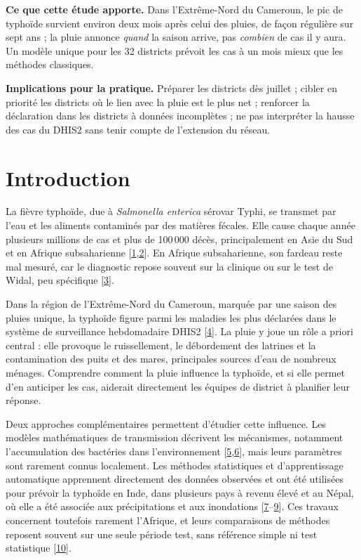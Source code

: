 \documentclass[11pt]{article}
\begin{document}
\textbf{Ce que cette étude apporte.} Dans l'Extrême-Nord du Cameroun, le pic de typhoïde survient environ deux mois après celui des pluies, de façon régulière sur sept ans ; la pluie annonce \textit{quand} la saison arrive, pas \textit{combien} de cas il y aura. Un modèle unique pour les 32 districts prévoit les cas à un mois mieux que les méthodes classiques.


\textbf{Implications pour la pratique.} Préparer les districts dès juillet ; cibler en priorité les districts où le lien avec la pluie est le plus net ; renforcer la déclaration dans les districts à données incomplètes ; ne pas interpréter la hausse des cas du DHIS2 sans tenir compte de l'extension du réseau.

\section{Introduction}
La fièvre typhoïde, due à \textit{Salmonella enterica} sérovar Typhi, se transmet par l'eau et les aliments contaminés par des matières fécales. Elle cause chaque année plusieurs millions de cas et plus de 100\,000 décès, principalement en Asie du Sud et en Afrique subsaharienne [\hyperlink{ref1}{1},\hyperlink{ref2}{2}]. En Afrique subsaharienne, son fardeau reste mal mesuré, car le diagnostic repose souvent sur la clinique ou sur le test de Widal, peu spécifique [\hyperlink{ref3}{3}].

Dans la région de l'Extrême-Nord du Cameroun, marquée par une saison des pluies unique, la typhoïde figure parmi les maladies les plus déclarées dans le système de surveillance hebdomadaire DHIS2 [\hyperlink{ref4}{4}]. La pluie y joue un rôle a priori central : elle provoque le ruissellement, le débordement des latrines et la contamination des puits et des mares, principales sources d'eau de nombreux ménages. Comprendre comment la pluie influence la typhoïde, et si elle permet d'en anticiper les cas, aiderait directement les équipes de district à planifier leur réponse.

Deux approches complémentaires permettent d'étudier cette influence. Les modèles mathématiques de transmission décrivent les mécanismes, notamment l'accumulation des bactéries dans l'environnement [\hyperlink{ref5}{5},\hyperlink{ref6}{6}], mais leurs paramètres sont rarement connus localement. Les méthodes statistiques et d'apprentissage automatique apprennent directement des données observées et ont été utilisées pour prévoir la typhoïde en Inde, dans plusieurs pays à revenu élevé et au Népal, où elle a été associée aux précipitations et aux inondations [\hyperlink{ref7}{7}--\hyperlink{ref9}{9}]. Ces travaux concernent toutefois rarement l'Afrique, et leurs comparaisons de méthodes reposent souvent sur une seule période test, sans référence simple ni test statistique [\hyperlink{ref10}{10}].
\end{document}
